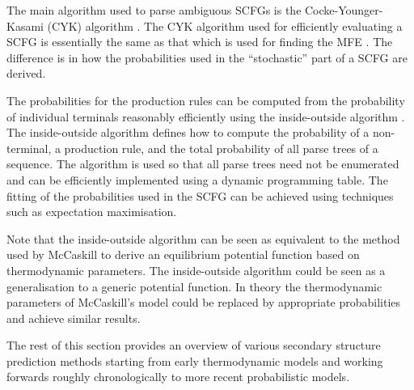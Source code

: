 \documentclass[journal]{IEEEtran}
\begin{document}
The main algorithm used to parse ambiguous SCFGs is the Cocke-Younger-Kasami (CYK) algorithm \cite{giegerich2014introduction, cocke1969programming, younger1967recognition, kasami1965efficient} . The CYK algorithm used for efficiently evaluating a SCFG is essentially the same as that which is used for finding the MFE \cite{zuker1981optimal}. The difference is in how the probabilities used in the ``stochastic'' part of a SCFG are derived.

The probabilities for the production rules can be computed from the probability of individual terminals reasonably efficiently using the inside-outside algorithm \cite{lari1990estimation}. The inside-outside algorithm defines how to compute the probability of a non-terminal, a production rule, and the total probability of all parse trees of a sequence. The algorithm is used so that all parse trees need not be enumerated and can be efficiently implemented using a dynamic programming table. The fitting of the probabilities used in the SCFG can be achieved using techniques such as expectation maximisation. 

Note that the inside-outside algorithm can be seen as equivalent to the method used by McCaskill \cite{mccaskill1990equilibrium} to derive an equilibrium potential function based on thermodynamic parameters. The inside-outside algorithm could be seen as a generalisation to a generic potential function. In theory the thermodynamic parameters of McCaskill's model could be replaced by appropriate probabilities and achieve similar results.

The rest of this section provides an overview of various secondary structure prediction methods starting from early thermodynamic models and working forwards roughly chronologically to more recent probabilistic models.
\end{document}
